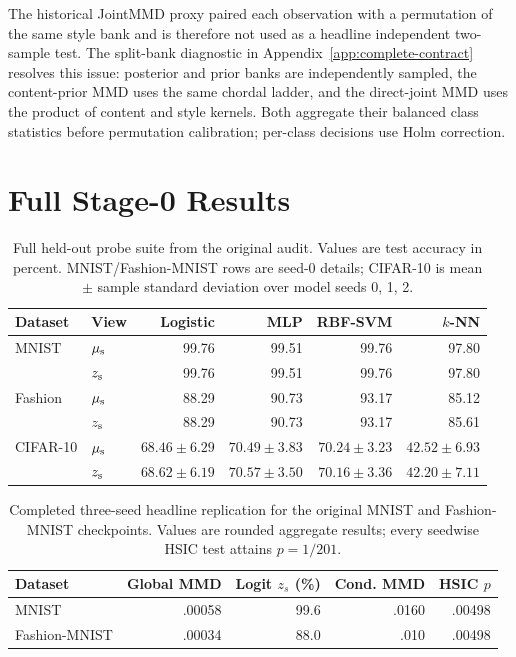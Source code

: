 The historical JointMMD proxy paired each observation with a permutation of
the same style bank and is therefore not used as a headline independent
two-sample test.  The split-bank diagnostic in
Appendix~\ref{app:complete-contract} resolves this issue: posterior and
prior banks are independently sampled, the content-prior MMD uses the same
chordal ladder, and the direct-joint MMD uses the product of content and style
kernels.  Both aggregate their balanced class statistics before permutation
calibration; per-class decisions use Holm correction.

\section{Full Stage-0 Results}
\label{app:full-results}

\begin{table}[ht]
\caption{Full held-out probe suite from the original audit.  Values are test
accuracy in percent.  MNIST/Fashion-MNIST rows are seed-0 details; CIFAR-10 is
mean $\pm$ sample standard deviation over model seeds 0, 1, 2.}
\label{tab:full-probes}
\centering
\small
\begin{tabular}{llrrrr}
\toprule
Dataset & View & Logistic & MLP & RBF-SVM & $k$-NN \\
\midrule
MNIST & $\mu_{\mathrm{s}}$ & 99.76 & 99.51 & 99.76 & 97.80 \\
      & $z_{\mathrm{s}}$  & 99.76 & 99.51 & 99.76 & 97.80 \\
Fashion & $\mu_{\mathrm{s}}$ & 88.29 & 90.73 & 93.17 & 85.12 \\
        & $z_{\mathrm{s}}$  & 88.29 & 90.73 & 93.17 & 85.61 \\
CIFAR-10 & $\mu_{\mathrm{s}}$ & $68.46\pm6.29$ & $70.49\pm3.83$ &
$70.24\pm3.23$ & $42.52\pm6.93$ \\
         & $z_{\mathrm{s}}$ & $68.62\pm6.19$ & $70.57\pm3.50$ &
$70.16\pm3.36$ & $42.20\pm7.11$ \\
\bottomrule
\end{tabular}
\end{table}

\begin{table}[ht]
\caption{Completed three-seed headline replication for the original MNIST and
Fashion-MNIST checkpoints.  Values are rounded aggregate results; every
seedwise HSIC test attains $p=1/201$.}
\label{tab:mnist-fashion-aggregate}
\centering
\small
\begin{tabular}{lrrrr}
\toprule
Dataset & Global MMD & Logit $z_s$ (\%) & Cond. MMD & HSIC $p$ \\
\midrule
MNIST & .00058 & 99.6 & .0160 & .00498 \\
Fashion-MNIST & .00034 & 88.0 & .010 & .00498 \\
\bottomrule
\end{tabular}
\end{table}

